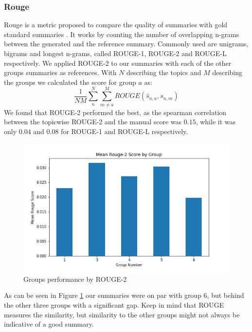 \subsubsection{Rouge}
Rouge is a metric proposed to compare the quality of summaries with gold standard summaries \cite{lin2004rouge}. It works by counting the number of overlapping n-grams between the generated and the reference summary. Commonly used are unigrams, bigrams and longest n-grams, called ROUGE-1, ROUGE-2 and ROUGE-L respectively. We applied ROUGE-2 to our summaries with each of the other groups summaries as references. With $N$ describing the topics and $M$ describing the groups we calculated the score for group $a$ as:
$$\frac{1}{NM} \sum^N_{n} \sum^M_{m\neq a} ROUGE(\hat{s}_{n,a}, s_{n,m}) $$
We found that ROUGE-2 performed the best, as the spearman correlation between the topicwise ROUGE-2 and the manual score was $0.15$, while it was only $0.04$ and $0.08$ for ROUGE-1 and ROUGE-L respectively.

\begin{figure}[!ht]
	\centering
	\includegraphics[width=0.55\linewidth]{../evaluation/meanrouge.png}
	\caption{Groups performance by ROUGE-2}
	\label{fig:rouge}
\end{figure}

As can be seen in Figure \ref{fig:rouge} our summaries were on par with group 6, but behind the other three groups with a significant gap. Keep in mind that ROUGE measures the similarity, but similarity to the other groups might not always be indicative of a good summary. 